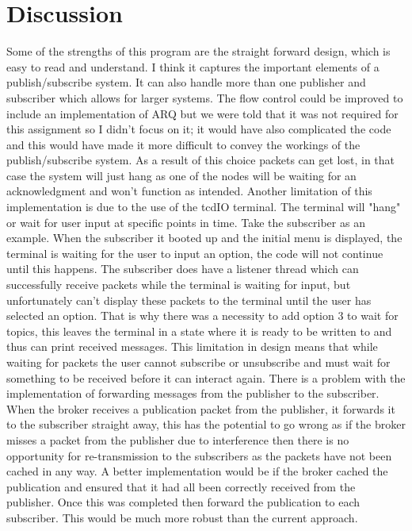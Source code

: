 \documentclass{article}
\begin{document}
\section{Discussion}
\label{sec:Discussion}

Some of the strengths of this program are the straight forward design, which is easy to read and understand. I think it captures the important elements of a publish/subscribe system. It can also handle more than one publisher and subscriber which allows for larger systems.
\newline
\newline
The flow control could be improved to include an implementation of ARQ but we were told that it was not required for this assignment so I didn't focus on it; it would have also complicated the code and this would have made it more difficult to convey the workings of the publish/subscribe system. As a result of this choice packets can get lost, in that case the system will just hang as one of the nodes will be waiting for an acknowledgment and won't function as intended.
\newline
\newline
Another limitation of this implementation is due to the use of the tcdIO terminal. The terminal will "hang" or wait for user input at specific points in time. Take the subscriber as an example. When the subscriber it booted up and the initial menu is displayed, the terminal is waiting for the user to input an option, the code will not continue until this happens. The subscriber does have a listener thread which can successfully receive packets while the terminal is waiting for input, but unfortunately can't display these packets to the terminal until the user has selected an option. That is why there was a necessity to add option 3 to wait for topics, this leaves the terminal in a state where it is ready to be written to and thus can print received messages. This limitation in design means that while waiting for packets the user cannot subscribe or unsubscribe and must wait for something to be received before it can interact again.
\newline
\newline
There is a problem with the implementation of forwarding messages from the publisher to the subscriber. When the broker receives a publication packet from the publisher, it forwards it to the subscriber straight away, this has the potential to go wrong as if the broker misses a packet from the publisher due to interference then there is no opportunity for re-transmission to the subscribers as the packets have not been cached in any way. A better implementation would be if the broker cached the publication and ensured that it had all been correctly received from the publisher. Once this was completed then forward the publication to each subscriber. This would be much more robust than the current approach.
\end{document}
